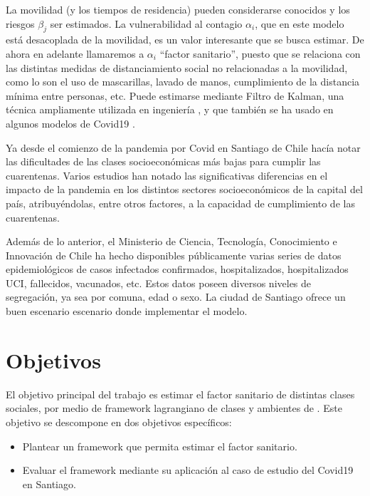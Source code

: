 \begin{intro}
La movilidad (y los tiempos de residencia) pueden considerarse conocidos y los riesgos \(\beta_j\) ser estimados. La vulnerabilidad al contagio \(\alpha_i\), que en este modelo está desacoplada de la movilidad, es un valor interesante que se busca estimar. De ahora en adelante llamaremos a \(\alpha_i\) ``factor sanitario'', puesto que se relaciona con las distintas medidas de distanciamiento social no relacionadas a la movilidad, como lo son el uso de mascarillas, lavado de manos, cumplimiento de la distancia mínima entre personas, etc. Puede estimarse mediante Filtro de Kalman, una técnica ampliamente utilizada en ingeniería \cite{Auger2013}, y que también se ha usado en algunos modelos de Covid19 \cite{Hasan2020}\cite{Song2021}.

Ya desde el comienzo de la pandemia por Covid en Santiago de Chile \cite{Olivares2020} hacía notar las dificultades de las clases socioeconómicas más bajas para cumplir las cuarentenas.
Varios estudios \cite{Mena2021}\cite{Bennett2021}\cite{Gozzi2021} han notado las significativas diferencias en el impacto de la pandemia en los distintos sectores socioeconómicos de la capital del país, atribuyéndolas, entre otros factores, a la capacidad de cumplimiento de las cuarentenas. 

Además de lo anterior, el Ministerio de Ciencia, Tecnología, Conocimiento e Innovación de Chile ha hecho disponibles públicamente varias series de datos epidemiológicos de casos infectados confirmados, hospitalizados, hospitalizados UCI, fallecidos, vacunados, etc. Estos datos poseen diversos niveles de segregación, ya sea por comuna, edad o sexo. La ciudad de Santiago ofrece un buen escenario escenario donde implementar el modelo.

\section*{Objetivos}

El objetivo principal del trabajo es estimar el factor sanitario de distintas clases sociales, por medio de framework lagrangiano de clases y ambientes de \cite{Bichara2018}. Este objetivo se descompone en dos objetivos específicos:
\begin{itemize}
    \item Plantear un framework que permita estimar el factor sanitario.
    \item Evaluar el framework mediante su aplicación al caso de estudio del Covid19 en Santiago.
\end{itemize}



\end{intro}
